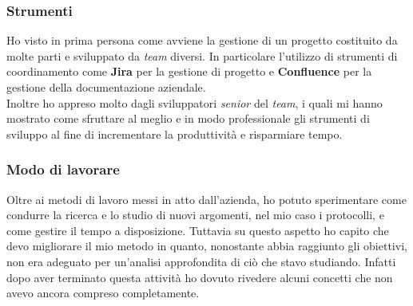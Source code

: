 \subsubsection{Strumenti}
Ho visto in prima persona come avviene la gestione di un progetto costituito da molte parti e sviluppato da \textit{team} diversi. In particolare l'utilizzo di strumenti di coordinamento come \textbf{Jira} per la gestione di progetto e \textbf{Confluence} per la gestione della documentazione aziendale. \\
Inoltre ho appreso molto dagli sviluppatori \textit{senior} del \textit{team}, i quali mi hanno mostrato come sfruttare al meglio e in modo professionale gli strumenti di sviluppo al fine di incrementare la produttività e risparmiare tempo.

\subsubsection{Modo di lavorare}
Oltre ai metodi di lavoro messi in atto dall'azienda, ho potuto sperimentare come condurre la ricerca e lo studio di nuovi argomenti, nel mio caso i protocolli, e come gestire il tempo a disposizione. Tuttavia su questo aspetto ho capito che devo migliorare il mio metodo in quanto, nonostante abbia raggiunto gli obiettivi, non era adeguato per un'analisi approfondita di ciò che stavo studiando. Infatti dopo aver terminato questa attività ho dovuto rivedere alcuni concetti che non avevo ancora compreso completamente.
